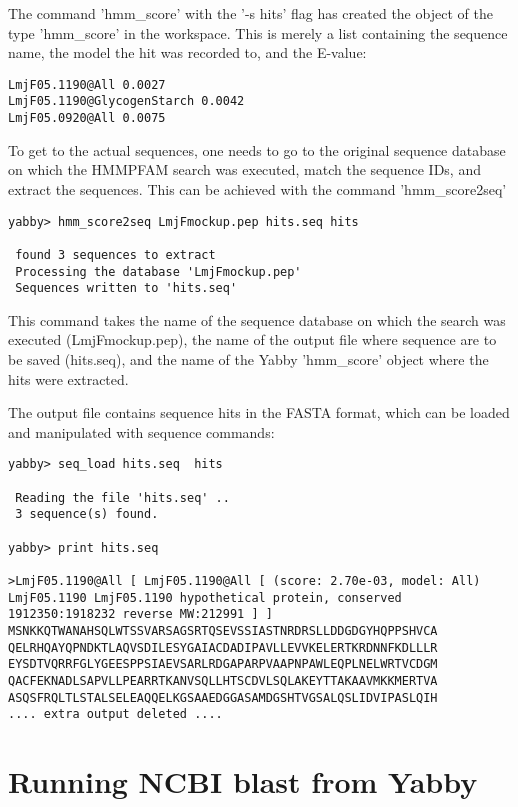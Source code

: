 The command 'hmm\_score' with the '-s hits' flag has created
the object of the type 'hmm\_score' in the workspace. This is
merely a list containing the sequence name, the model the
hit was recorded to, and the E-value:

\begin{verbatim}
LmjF05.1190@All 0.0027
LmjF05.1190@GlycogenStarch 0.0042
LmjF05.0920@All 0.0075
\end{verbatim}

To get to the actual sequences, one needs to go to the
original sequence database on which the HMMPFAM search
was executed, match the sequence IDs, and extract the
sequences. This can be achieved with the command
'hmm\_score2seq'

\begin{verbatim}
yabby> hmm_score2seq LmjFmockup.pep hits.seq hits

 found 3 sequences to extract
 Processing the database 'LmjFmockup.pep'
 Sequences written to 'hits.seq'
\end{verbatim}

This command takes the name of the sequence database on
which the search was executed (LmjFmockup.pep), the name
of the output file where sequence are to be saved (hits.seq),
and the name of the Yabby 'hmm\_score' object where the
hits were extracted.

The output file contains sequence hits in the FASTA format,
which can be loaded and manipulated with sequence commands: 

\begin{verbatim}
yabby> seq_load hits.seq  hits

 Reading the file 'hits.seq' ..
 3 sequence(s) found.

yabby> print hits.seq

>LmjF05.1190@All [ LmjF05.1190@All [ (score: 2.70e-03, model: All) LmjF05.1190 LmjF05.1190 hypothetical protein, conserved 1912350:1918232 reverse MW:212991 ] ]
MSNKKQTWANAHSQLWTSSVARSAGSRTQSEVSSIASTNRDRSLLDDGDGYHQPPSHVCA
QELRHQAYQPNDKTLAQVSDILESYGAIACDADIPAVLLEVVKELERTKRDNNFKDLLLR
EYSDTVQRRFGLYGEESPPSIAEVSARLRDGAPARPVAAPNPAWLEQPLNELWRTVCDGM
QACFEKNADLSAPVLLPEARRTKANVSQLLHTSCDVLSQLAKEYTTAKAAVMKKMERTVA
ASQSFRQLTLSTALSELEAQQELKGSAAEDGGASAMDGSHTVGSALQSLIDVIPASLQIH
.... extra output deleted ....
\end{verbatim}


\section{Running NCBI blast from Yabby}

